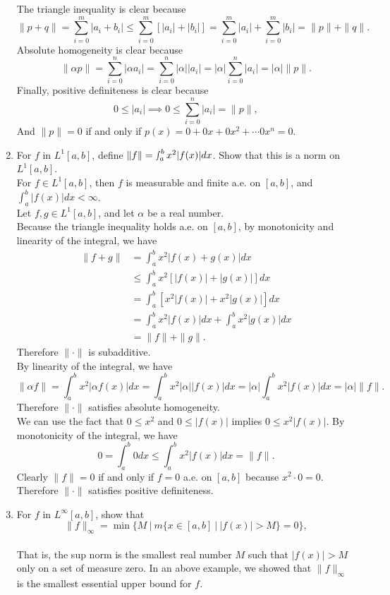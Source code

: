 \begin{enumerate}
	The triangle inequality is clear because 
	\[
		\|p+q\| = \sum_{i=0}^{m}|a_i+b_i|\le\sum_{i=0}^{m}[|a_i|+|b_i|]=\sum_{i=0}^{m}|a_i|+\sum_{i=0}^{m}|b_i|=\|p\|+\|q\|.
	\]
	Absolute homogeneity is clear because
	\[
		\|\alpha p\| = \sum_{i=0}^n|\alpha a_i|= \sum_{i=0}^n|\alpha|| a_i|=|\alpha|\sum_{i=0}^n| a_i|=|\alpha|\|p\|.
	\]
	Finally, positive definiteness is clear because
	\[
		0 \le |a_i| \implies 0\le \sum_{i=0}^n| a_i|=\|p\|,
	\]
	And $\|p\|=0$ if and only if $p(x)= 0+0x+0x^2+\cdots0x^n=0$.
	\item For $f$ in $L^1[a,b]$, define $\|f\| = \smallint_a^b x^2 |f(x)|dx$.
	Show that this is a norm on $L^1[a,b]$.\\
	For $f\in L^1[a,b]$, then $f$ is measurable and finite a.e. on $[a,b]$, and $\int_a^b|f(x)|dx<\infty$.\\
	Let $f,g\in L^1[a,b]$, and let $\alpha$ be a real number.\\
	Because the triangle inequality holds a.e. on $[a,b]$, by monotonicity and linearity of the integral, we have
	\begin{align*}
	\|f+g\|&=\int_a^b x^2 |f(x)+g(x)|dx\\
	&\le\int_a^b x^2 [|f(x)|+|g(x)|]dx\\
	&=\int_a^b [x^2 |f(x)|+x^2|g(x)|]dx\\
	&=\int_a^b x^2 |f(x)|dx+\int_a^b x^2 |g(x)|dx\\
	&= \|f\|+\|g\|.	
	\end{align*}
	Therefore $\|\cdot\|$ is subadditive.\\
	By linearity of the integral, we have
	\[
	\|\alpha f\| = \int_a^bx^2|\alpha f(x)|dx = \int_a^bx^2|\alpha| |f(x)|dx=|\alpha |\int_a^bx^2 |f(x)|dx	=|\alpha |\|f\|.
	\]
	Therefore $\|\cdot\|$ satisfies absolute homogeneity.\\
	We can use the fact that $0\le x^2$ and $0\le |f(x)|$ implies $0\le x^2|f(x)|$.
	By monotonicity of the integral, we have
	\[
	0=\int_a^b0dx \le \int_a^bx^2|f(x)|dx = \|f\|.
	\]
	Clearly $\|f\|=0$ if and only if $f=0$ a.e. on $[a,b]$ because $x^2\cdot 0 = 0$.\\
	Therefore $\|\cdot \|$ satisfies positive definiteness.
	\item For $f$ in $L^\infty[a,b]$, show that 
	\[
	\| f\|_\infty = \min \biggl \{ M \ \biggl |\ m \{x \in [a,b]\ |\ |f(x)| > M \} =0 \biggr \},
	\] 
	\\
	That is, the sup norm is the smallest real number $M$ such that $|f(x)|>M$ only on a set of measure zero.
	In an above example, we showed that $\|f\|_\infty$ is the smallest essential upper bound for $f$.

\end{enumerate}
